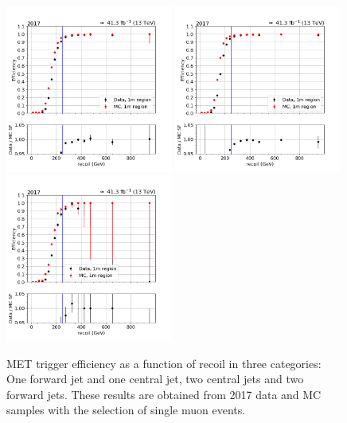 \begin{figure}[htp]
    \begin{center}
        \includegraphics[width=0.49\textwidth]{fig/efficiency/trigger/met/recoil/data_mc_comparison_1m_2017_one_jet_forward_one_jet_central.png}
        \includegraphics[width=0.49\textwidth]{fig/efficiency/trigger/met/recoil/data_mc_comparison_1m_2017_two_central_jets.png} \\
        \includegraphics[width=0.49\textwidth]{fig/efficiency/trigger/met/recoil/data_mc_comparison_1m_2017_two_forward_jets.png}
    \end{center}
    \caption{MET trigger efficiency as a function of recoil in three categories: One forward jet and one central jet, two central jets and
            two forward jets. These results are obtained from 2017 data and MC samples with the selection of single muon events.} 
    \label{fig:eff_recoil_2017_1m}
\end{figure}

